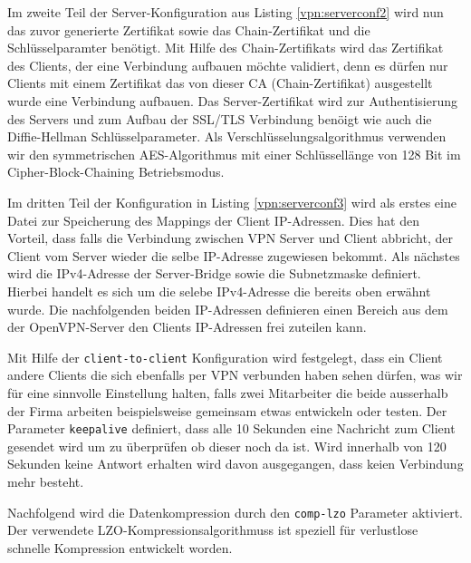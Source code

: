 

Im zweite Teil der Server-Konfiguration aus Listing \ref{vpn:serverconf2} wird nun das zuvor generierte Zertifikat sowie das Chain-Zertifikat und die Schlüsselparamter benötigt. Mit Hilfe des Chain-Zertifikats wird das Zertifikat des Clients, der eine Verbindung aufbauen möchte validiert, denn es dürfen nur Clients mit einem Zertifikat das von dieser CA (Chain-Zertifikat) ausgestellt wurde eine Verbindung aufbauen. Das Server-Zertifikat wird zur Authentisierung des Servers und zum Aufbau der SSL/TLS Verbindung benöigt wie auch die Diffie-Hellman Schlüsselparameter. Als Verschlüsselungsalgorithmus verwenden wir den symmetrischen AES-Algorithmus mit einer Schlüssellänge von 128 Bit im Cipher-Block-Chaining Betriebsmodus.



Im dritten Teil der Konfiguration in Listing \ref{vpn:serverconf3} wird als erstes eine Datei zur Speicherung des Mappings der Client IP-Adressen. Dies hat den Vorteil, dass falls die Verbindung zwischen VPN Server und Client abbricht, der Client vom Server wieder die selbe IP-Adresse zugewiesen bekommt. Als nächstes wird die IPv4-Adresse der Server-Bridge sowie die Subnetzmaske definiert. Hierbei handelt es sich um die selebe IPv4-Adresse die bereits oben erwähnt wurde. Die nachfolgenden beiden IP-Adressen definieren einen Bereich aus dem der OpenVPN-Server den Clients IP-Adressen frei zuteilen kann.

Mit Hilfe der \texttt{client-to-client} Konfiguration wird festgelegt, dass ein Client andere Clients die sich ebenfalls per VPN verbunden haben sehen dürfen, was wir für eine sinnvolle Einstellung halten, falls zwei Mitarbeiter die beide ausserhalb der Firma arbeiten beispielsweise gemeinsam etwas entwickeln oder testen.
Der Parameter \texttt{keepalive} definiert, dass alle 10 Sekunden eine Nachricht zum Client gesendet wird um zu überprüfen ob dieser noch da ist. Wird innerhalb von 120 Sekunden keine Antwort erhalten wird davon ausgegangen, dass keien Verbindung mehr besteht.

Nachfolgend wird die Datenkompression durch den \texttt{comp-lzo} Parameter aktiviert. Der verwendete LZO-Kompressionsalgorithmuss ist speziell für verlustlose schnelle Kompression entwickelt worden.

